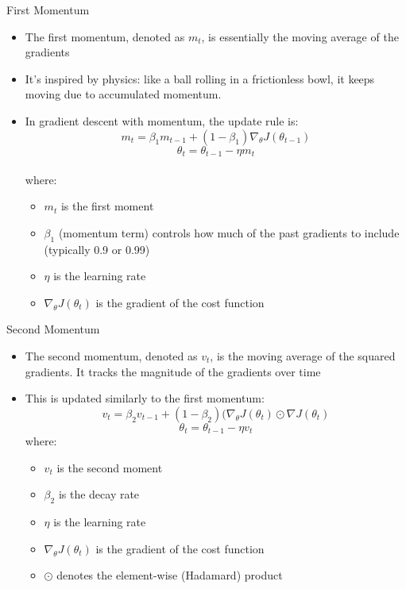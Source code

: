 \documentclass[serif, aspectratio=169]{beamer}
\begin{document}
\begin{frame}{First Momentum}
    \begin{itemize}
        \item The first momentum, denoted as $m_t$, is essentially the moving average of the gradients
         \item It’s inspired by physics: like a ball rolling in a frictionless bowl, it keeps moving due to accumulated momentum.
        \item In gradient descent with momentum, the update rule is:
        \[m_t = \beta_1 m_{t-1} + (1 - \beta_1) \nabla_{\theta}J(\theta_{t-1})\]
        \[\theta_t = \theta_{t-1} - \eta m_t\]\\
        where:
        \begin{itemize}
            \item $m_t$ is the first moment
            \item $\beta_1$ (momentum term) controls how much of the past gradients to include (typically 0.9 or 0.99)\\
            \item $\eta$ is the learning rate\\ 
            \item $\nabla_{\theta}J(\theta_t)$ is the gradient of the cost function
        \end{itemize}
    \end{itemize}
\end{frame}

\begin{frame}{Second Momentum}
    \begin{itemize}
        \item The second momentum, denoted as $v_t$, is the moving average of the squared gradients. It tracks the magnitude of the gradients over time
        \item This is updated similarly to the first momentum:
        \[v_t = \beta_2 v_{t-1} + (1 - \beta_2) (\nabla_{\theta} J(\theta_t) \odot \nabla J(\theta_t)\]
        \[\theta_t = \theta_{t-1} - \eta v_t\]
        where:
        \begin{itemize}
        \item $v_t$ is the second moment%
        \item$\beta_2$ is the decay rate
        \item$\eta$ is the learning rate
        \item$\nabla_{\theta}J(\theta_t)$ is the gradient of the cost function
        \item $\odot$ denotes the element-wise (Hadamard) product
        \end{itemize}
    \end{itemize}
\end{frame}
\end{document}
